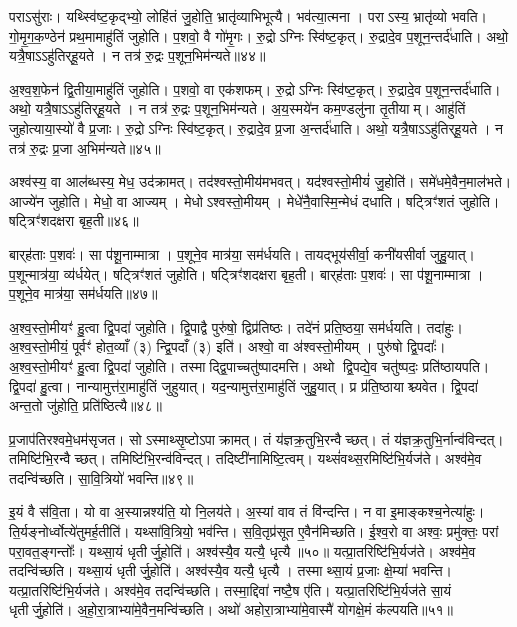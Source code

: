 पराऽसु॑राः।
यथ्स्वि॑ष्ट॒कृद्भ्यो॒ लोहि॑तं जु॒होति॒ भ्रातृ॑व्याभिभूत्यै।
भव॑त्या॒त्मना।
पराऽस्य॒ भ्रातृ॑व्यो भवति।
गो॒मृ॒ग॒क॒ण्ठेन॑ प्रथ॒मामाहु॑तिं जुहोति।
प॒शवो॒ वै गो॑मृ॒गः।
रु॒द्रो\-ऽग्निः स्वि॑ष्ट॒कृत्।
रु॒द्रादे॒व प॒शून॒न्तर्द॑धाति।
अथो॒ यत्रै॒षा\-ऽऽहु॑तिर्‌\mbox{}हू॒यते।
न तत्र॑ रु॒द्रः प॒शून॒भिम॑न्यते॥४४॥

अ॒श्व॒श॒फेन॑ द्वि॒तीया॒माहु॑तिं जुहोति।
प॒शवो॒ वा एक॑शफम्।
रु॒द्रो\-ऽग्निः स्वि॑ष्ट॒कृत्।
रु॒द्रादे॒व प॒शून॒न्तर्द॑धाति।
अथो॒ यत्रै॒षा\-ऽऽहु॑तिर्‌\mbox{}हू॒यते।
न तत्र॑ रु॒द्रः प॒शून॒भिम॑न्यते।
अ॒य॒स्मये॑न कम॒ण्डलु॑ना तृ॒तीयाम्।
आहु॑तिं जुहोत्याया॒स्यो॑ वै प्र॒जाः।
रु॒द्रो\-ऽग्निः स्वि॑ष्ट॒कृत्।
रु॒द्रादे॒व प्र॒जा अ॒न्तर्द॑धाति।
अथो॒ यत्रै॒षा\-ऽऽहु॑तिर्‌\mbox{}हू॒यते।
न तत्र॑ रु॒द्रः प्र॒जा अ॒भिम॑न्यते॥४५॥\anuvakamend[द॒धा॒त्यभ॑वन्मन्यते प्र॒जा अ॒न्तर्द॑धाति॒ द्वे च॑ ]

अश्व॑स्य॒ वा आल॑ब्धस्य॒ मेध॒ उद॑क्रामत्।
तद॑श्वस्तो॒मीय॑मभवत्।
यद॑श्वस्तो॒मीयं॑ जु॒होति॑।
समे॑धमे॒वैन॒माल॑भते।
आज्ये॑न जुहोति।
मेधो॒ वा आज्यम्।
मेधो\-ऽश्वस्तो॒मीयम्।
मेधे॑नै॒वास्मि॒न्मेधं दधाति।
षट्त्रिꣳ॑शतं जुहोति।
षट्त्रिꣳ॑शदक्षरा बृह॒ती॥४६॥

बार्‌\mbox{}ह॑ताः प॒शवः॑।
सा प॑शू॒नाम्मात्रा।
प॒शूने॒व मात्र॑या॒ सम॑र्धयति।
तायद्भूय॑सीर्वा॒ कनी॑यसीर्वा जुहु॒यात्।
प॒शून्मात्र॑या॒ व्य॑र्धयेत्।
षट्त्रिꣳ॑शतं जुहोति।
षट्त्रिꣳ॑शदक्षरा बृह॒ती।
बार्‌\mbox{}ह॑ताः प॒शवः॑।
सा प॑शू॒नाम्मात्रा।
प॒शूने॒व मात्र॑या॒ सम॑र्धयति॥४७॥

अ॒श्व॒स्तो॒मीयꣳ॑ हु॒त्वा द्वि॒पदा॑ जुहोति।
द्वि॒पाद्वै पुरु॑षो॒ द्विप्र॑तिष्ठः।
तदे॑नं प्रति॒ष्ठया॒ सम॑र्धयति।
तदा॑हुः।
अ॒श्व॒स्तो॒मीयं॒ पूर्वꣳ॑ होत॒व्याँ (३) न्द्वि॒पदाँ (३) इति॑।
अश्वो॒ वा अ॑श्वस्तो॒मीयम्।
पुरु॑षो द्वि॒पदाः᳚।
अ॒श्व॒स्तो॒मीयꣳ॑ हु॒त्वा द्वि॒पदा॑ जुहोति।
तस्माद्द्वि॒पाच्चतु॑ष्पादमत्ति।
अथो द्वि॒पद्ये॒व चतु॑ष्पदः॒ प्रति॑ष्ठायपति।
द्वि॒पदा॑ हु॒त्वा।
नान्यामुत्त॑रा॒माहु॑तिं जुहुयात्।
यद॒न्यामुत्त॑रा॒माहु॑तिं जुहु॒यात्।
प्र प्र॑ति॒ष्ठायाश्च्यवेत।
द्वि॒पदा॑ अन्त॒तो जु॑होति॒ प्रति॑ष्ठित्यै॥४८॥

प्र॒जाप॑तिरश्वमे॒धम॑सृजत।
सोऽस्माथ्सृ॒ष्टो\-ऽपाक्रामत्।
तं य॑ज्ञक्र॒तुभि॒रन्वैच्छत्।
तं य॑ज्ञक्र॒तुभि॒र्नान्व॑विन्दत्।
तमिष्टि॑भि॒रन्वैच्छत्।
तमिष्टि॑भि॒रन्व॑विन्दत्।
तदिष्टी॑नामिष्टि॒त्वम्।
यथ्सं॑वथ्स॒रमिष्टि॑भि॒र्यज॑ते।
अश्व॑मे॒व तदन्वि॑च्छति।
सा॒वि॒त्रियो॑ भवन्ति॥४९॥

इ॒यं वै स॑वि॒ता।
यो वा अ॒स्यान्नश्य॑ति॒ यो नि॒लय॑ते।
अ॒स्यां वाव तं वि॑न्दन्ति।
न वा इ॒माङ्कश्च॒नेत्या॑हुः।
ति॒र्यङ्नोर्ध्वोत्ये॑तुमर्ह॒तीति॑।
यथ्सा॑वि॒त्रियो॒ भव॑न्ति।
स॒वि॒तृप्र॑सूत ए॒वैन॑मिच्छति।
ई॒श्व॒रो वा अश्वः॒ प्रमु॑क्तः॒ परां परा॒वत॒ङ्गन्तोः᳚।
यथ्सा॒यं धृतीर्जु॒होति॑।
अश्व॑स्यै॒व यत्यै॒ धृत्यै॥५०॥ यत्प्रा॒तरिष्टि॑भि॒र्यज॑ते।
अश्व॑मे॒व तदन्वि॑च्छति।
यथ्सा॒यं धृतीर्जु॒होति॑।
अश्व॑स्यै॒व यत्यै॒ धृत्यै।
तस्माथ्सा॒यं प्र॒जाः क्षे॒म्या॑ भवन्ति।
यत्प्रा॒तरिष्टि॑भि॒र्यज॑ते।
अश्व॑मे॒व तदन्वि॑च्छति।
तस्मा॒द्दिवा॑ नष्टै॒ष ए॑ति।
यत्प्रा॒तरिष्टि॑भि॒र्यज॑ते सा॒यं धृतीर्जु॒होति॑।
अ॒हो॒रा॒त्राभ्या॑मे॒वैन॒मन्वि॑च्छति।
अथो॑ अहोरा॒त्राभ्या॑मे॒वास्मै॑ योगक्षे॒मं क॑ल्पयति॥५१॥\anuvakamend[भ॒व॒न्ति॒ धृत्या॑ एन॒मन्वि॑च्छ॒त्येकं॑ च]

